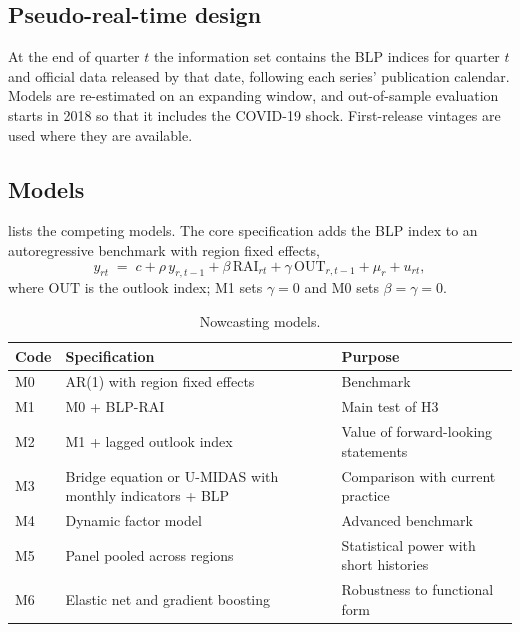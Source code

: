 \documentclass[11pt]{article}
\begin{document}
\subsection{Pseudo-real-time design}
At the end of quarter $t$ the information set contains the BLP indices for quarter $t$ and official data released by that date, following each series' publication calendar. Models are re-estimated on an expanding window, and out-of-sample evaluation starts in 2018 so that it includes the COVID-19 shock. First-release vintages are used where they are available.

\subsection{Models}
 lists the competing models. The core specification adds the BLP index to an autoregressive benchmark with region fixed effects,
\begin{equation}\label{eq:nowcast}
y_{rt} \;=\; c + \rho\, y_{r,t-1} + \beta\, \mathrm{RAI}_{rt} + \gamma\, \mathrm{OUT}_{r,t-1} + \mu_r + u_{rt},
\end{equation}
where $\mathrm{OUT}$ is the outlook index; M1 sets $\gamma = 0$ and M0 sets $\beta = \gamma = 0$.

\begin{table}[tbp]
\centering\small
\caption{Nowcasting models.}\label{tab:models}
\begin{tabularx}{\textwidth}{@{}L{1.0cm}L{6.4cm}Y@{}}
\toprule
Code & Specification & Purpose \\
\midrule
M0 & AR(1) with region fixed effects & Benchmark \\
M1 & M0 + BLP-RAI & Main test of H3 \\
M2 & M1 + lagged outlook index & Value of forward-looking statements \\
M3 & Bridge equation or U-MIDAS with monthly indicators + BLP & Comparison with current practice \\
M4 & Dynamic factor model & Advanced benchmark \\
M5 & Panel pooled across regions & Statistical power with short histories \\
M6 & Elastic net and gradient boosting & Robustness to functional form \\
\bottomrule
\end{tabularx}
\end{table}
\end{document}
